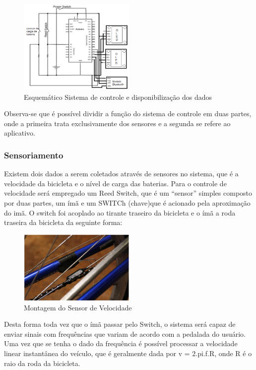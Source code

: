 			\graphicspath{{figuras/}}
			\begin{figure}[h!]
				\centering
				\includegraphics[width=0.5\textwidth]{Figura_7_sistema_de_controle.PNG}
				\caption{Esquemático Sistema de controle e disponibilização dos dados}
				\label{img:sistema_de_controle_e_disponibiização_de_dados}
			\end{figure}
			
		Observa-se que é possível dividir a função do sistema de controle em duas partes, onde a primeira trata exclusivamente dos sensores e a segunda se refere ao aplicativo.
	
		\subsubsection{Sensoriamento}
		Existem dois dados a serem coletados através de sensores no sistema, que é a velocidade da bicicleta e o nível de carga das baterias.
		Para o controle de velocidade será empregado um Reed Switch, que é um “sensor” simples composto por duas partes, um ímã e um SWITCh (chave)que é acionado pela aproximação do imã. O switch foi acoplado ao tirante traseiro da bicicleta e o ímã a roda traseira da bicicleta da seguinte forma:
			\graphicspath{{figuras/}}
			\begin{figure}[h!]
				\centering
				\includegraphics[width=0.5\textwidth]{Figura_8_montagem_do_sensor_velocidade.PNG}
				\caption{Montagem do Sensor de Velocidade}
				\label{img:montagem_do_sensor_velocidade}
			\end{figure}
		Desta forma toda vez que o ímã passar pelo Switch, o sistema será capaz de enviar sinais com frequências que variam de acordo com a pedalada do usuário. Uma vez que se tenha o dado da frequência é possível processar a velocidade linear instantânea do veículo, que é geralmente dada por v = 2.pi.f.R, onde R é o raio da roda da bicicleta.
		
